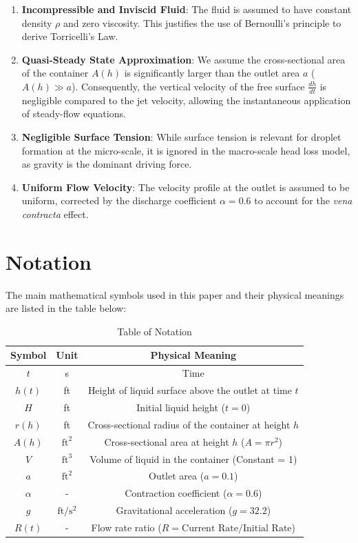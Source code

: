 \documentclass[a4paper, 12pt]{article}
\begin{document}
\begin{enumerate}
    \item \textbf{Incompressible and Inviscid Fluid}: The fluid is assumed to have constant density $\rho$ and zero viscosity. This justifies the use of Bernoulli’s principle to derive Torricelli’s Law.
    \item \textbf{Quasi-Steady State Approximation}: We assume the cross-sectional area of the container $A(h)$ is significantly larger than the outlet area $a$ ($A(h) \gg a$). Consequently, the vertical velocity of the free surface $\frac{dh}{dt}$ is negligible compared to the jet velocity, allowing the instantaneous application of steady-flow equations.
    \item \textbf{Negligible Surface Tension}: While surface tension is relevant for droplet formation at the micro-scale, it is ignored in the macro-scale head loss model, as gravity is the dominant driving force.
    \item \textbf{Uniform Flow Velocity}: The velocity profile at the outlet is assumed to be uniform, corrected by the discharge coefficient $\alpha=0.6$ to account for the \textit{vena contracta} effect.
\end{enumerate}

\section{Notation}

The main mathematical symbols used in this paper and their physical meanings are listed in the table below:

\begin{table}[H]
    \centering
    \caption{Table of Notation}
    \begin{tabular}{ccc}
    \toprule
    \textbf{Symbol} & \textbf{Unit} & \textbf{Physical Meaning} \\
    \midrule
    $t$ & s & Time \\
    $h(t)$ & ft & Height of liquid surface above the outlet at time $t$ \\
    $H$ & ft & Initial liquid height ($t=0$) \\
    $r(h)$ & ft & Cross-sectional radius of the container at height $h$ \\
    $A(h)$ & $\text{ft}^2$ & Cross-sectional area at height $h$ ($A = \pi r^2$) \\
    $V$ & $\text{ft}^3$ & Volume of liquid in the container (Constant = 1) \\
    $a$ & $\text{ft}^2$ & Outlet area ($a=0.1$) \\
    $\alpha$ & - & Contraction coefficient ($\alpha=0.6$) \\
    $g$ & $\text{ft}/\text{s}^2$ & Gravitational acceleration ($g=32.2$) \\
    $R(t)$ & - & Flow rate ratio ($R = \text{Current Rate}/\text{Initial Rate}$) \\
    \bottomrule
    \end{tabular}
\end{table}
\end{document}
